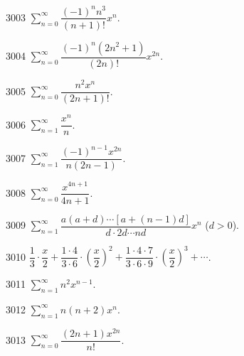 \begin{prob}[S]{3003}
$\sum\limits_{n=0}^{\infty} \dfrac{(-1)^n n^3}{(n+1)!} x^n$.
\end{prob}

\begin{prob}[S]{3004}
$\sum\limits_{n=0}^{\infty} \dfrac{(-1)^n(2n^2 + 1)}{(2n)!} x^{2n}$.
\end{prob}

\begin{prob}[S]{3005}
$\sum\limits_{n=0}^{\infty} \dfrac{n^2 x^n}{(2n+1)!}$.
\end{prob}


\begin{prob}[S]{3006}
$\sum\limits_{n=1}^{\infty} \dfrac{x^n}{n}$.
\end{prob}

\begin{prob}[S]{3007}
$\sum\limits_{n=1}^{\infty} \dfrac{(-1)^{n-1} x^{2n}}{n(2n-1)}$.
\end{prob}

\begin{prob}[S]{3008}
$\sum\limits_{n=0}^{\infty} \dfrac{x^{4n+1}}{4n+1}$.
\end{prob}

\begin{prob}[M]{3009}
$\sum\limits_{n=1}^{\infty} \dfrac{a(a+d)\cdots [a+(n-1)d]}{d \cdot 2d \cdots nd} x^n$ ($d > 0$). 
\end{prob}

\begin{prob}[S]{3010}
$\dfrac{1}{3} \cdot \dfrac{x}{2} + \dfrac{1\cdot 4}{3\cdot 6} \cdot \left(\dfrac{x}{2}\right)^2 + \dfrac{1\cdot 4\cdot 7}{3\cdot 6\cdot 9} \cdot \left(\dfrac{x}{2}\right)^3 + \cdots$.
\end{prob}


\begin{prob}[S]{3011}
$\sum\limits_{n=1}^{\infty} n^2 x^{n-1}$.
\end{prob}

\begin{prob}[S]{3012}
$\sum\limits_{n=1}^{\infty} n(n+2) x^n$.
\end{prob}

\begin{prob}[S]{3013}
$\sum\limits_{n=0}^{\infty} \dfrac{(2n+1)x^{2n}}{n!}$.
\end{prob}

